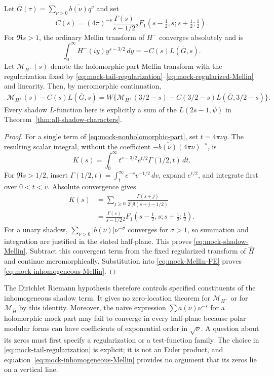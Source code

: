 \begin{proposition}\label{prop:mock-shadow-Mellin}
Let $\overline G(\tau)=\sum_{\nu>0}\overline{b(\nu)}q^\nu$ and set
\begin{equation}\label{eq:mock-kernel}
 C(s)=(4\pi)^{-s}\frac{\Gamma(s)}{s-1/2}
 {}_2F_1\left(s-\tfrac12,s;s+\tfrac12;\tfrac12\right).
\end{equation}
For $\Re s>1$, the ordinary Mellin transform of $H^-$ converges absolutely
and is
\begin{equation}\label{eq:mock-shadow-Mellin}
 \int_0^\infty H^-(iy)y^{s-3/2}\,dy=-C(s)L(\overline G,s).
\end{equation}
Let $\mathcal M_{H^+}(s)$ denote the holomorphic-part Mellin transform with
the regularization fixed by
\eqref{eq:mock-tail-regularization}--\eqref{eq:mock-regularized-Mellin} and
linearity.  Then, by meromorphic continuation,
\begin{align}
 \mathcal M_{H^+}(s)-C(s)L(\overline G,s)
 =W\bigl\{\mathcal M_{H^+}(3/2-s)
       -C(3/2-s)L(\overline G,3/2-s)\bigr\}.
 \label{eq:mock-inhomogeneous-Mellin}
\end{align}
Every shadow $L$-function here is explicitly a sum of the
$L(2s-1,\psi)$ in Theorem~\ref{thm:all-shadow-characters}.
\end{proposition}
\begin{proof}
For a single term of \eqref{eq:mock-nonholomorphic-part}, set $t=4\pi\nu y$.
The resulting scalar integral, without the coefficient
$-\overline{b(\nu)}(4\pi\nu)^{-s}$, is
\[
 K(s)=\int_0^\infty t^{s-3/2}e^{t/2}\Gamma(1/2,t)\,dt.
\]
For $\Re s>1/2$, insert
$\Gamma(1/2,t)=\int_t^\infty e^{-v}v^{-1/2}\,dv$, expand $e^{t/2}$, and
integrate first over $0<t<v$.  Absolute convergence gives
\begin{align*}
 K(s)&=\sum_{j\geq0}\frac{\Gamma(s+j)}{2^j j!(s+j-1/2)}\\
 &=\frac{\Gamma(s)}{s-1/2}
 {}_2F_1\left(s-\tfrac12,s;s+\tfrac12;\tfrac12\right).
\end{align*}
For a unary shadow, $\sum_{\nu>0}|b(\nu)|\nu^{-\sigma}$ converges for
$\sigma>1$, so summation and integration are justified in the stated
half-plane.  This proves \eqref{eq:mock-shadow-Mellin}.
Subtract this convergent term from the fixed regularized transform of
$\widehat H$ and continue meromorphically.  Substitution into
\eqref{eq:mock-Mellin-FE} proves
\eqref{eq:mock-inhomogeneous-Mellin}.
\end{proof}

The Dirichlet Riemann hypothesis therefore controls specified constituents
of the inhomogeneous shadow term.  It gives no zero-location theorem for
$\mathcal M_{H^+}$ or for $\mathcal M_{\widehat H}$ by this identity.
Moreover, the naive expression $\sum a(\nu)\nu^{-s}$ for a holomorphic
mock part may fail to converge in every half-plane because polar modular
forms can have coefficients of exponential order in $\sqrt\nu$.
A question about its zeros must first specify a regularization or a
test-function family.  The choice in
\eqref{eq:mock-tail-regularization} is explicit; it is not an Euler product,
and equation~\eqref{eq:mock-inhomogeneous-Mellin} provides no argument that
its zeros lie on a vertical line.
